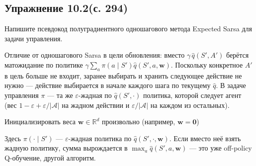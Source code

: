 \subsection{Упражнение 10.2(с. 294)}
Напишите псевдокод полуградиентного одношагового метода Expected Sarsa для
задачи управления.

\begin{solution}
    Отличие от одношагового Sarsa в цели обновления: вместо $\gamma\,\hat
    q(S',A')$ берётся матожидание по политике $\gamma\sum_a \pi(a\mid S')\hat
    q(S',a,\mathbf w)$. Поскольку конкретное $A'$ в цель больше не входит,
    заранее выбирать и хранить следующее действие не нужно --- действие
    выбирается в начале каждого шага по текущему $\hat q$. В задаче управления
    $\pi$ --- та же $\varepsilon$-жадная по $\hat q(S',\cdot)$ политика, которой
    следует агент (вес $1-\varepsilon+\varepsilon/|\mathcal A|$ на жадном действии
    и $\varepsilon/|\mathcal A|$ на каждом из остальных).

    \begin{algorithm}[H]
        \DontPrintSemicolon
        Инициализировать веса $\mathbf w\in\mathbb R^d$ произвольно (например, $\mathbf w=\mathbf 0$)\;
    \end{algorithm}

    Здесь $\pi(\cdot\mid S')$ --- $\varepsilon$-жадная политика по $\hat
    q(S',\cdot,\mathbf w)$. Если вместо неё взять жадную политику, сумма
    вырождается в $\max_a \hat q(S',a,\mathbf w)$ --- это уже off-policy
    Q-обучение, другой алгоритм.
\end{solution}

